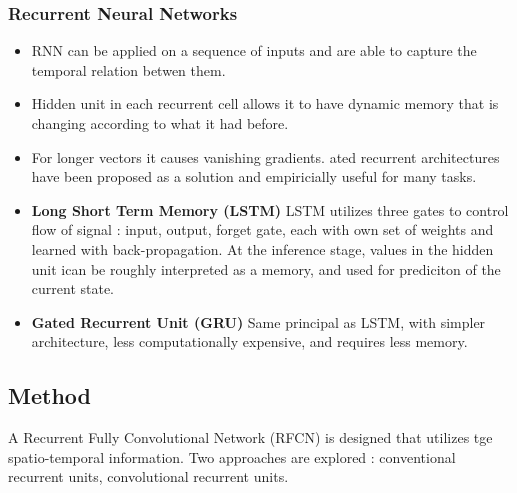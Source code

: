 \documentclass{article}
\begin{document}
\subsubsection{Recurrent Neural Networks}
\begin{itemize}
\item RNN can be applied on a sequence of inputs and are able to capture the temporal relation betwen them.
\item Hidden unit in each recurrent cell allows it to have dynamic memory that is changing according to what it had before.
\item For longer vectors it causes vanishing gradients. ated recurrent architectures have been proposed as a solution and empiricially useful for many tasks.
\item \textbf{Long Short Term Memory (LSTM)}
    LSTM utilizes three gates to control flow of signal : input, output, forget gate, each with own set of weights and learned with back-propagation. At the inference stage, values in the hidden unit ican be roughly interpreted as a memory, and used for prediciton of the current state.
\item \textbf{Gated Recurrent Unit (GRU)}
    Same principal as LSTM, with simpler architecture, less computationally expensive, and requires less memory.
\end{itemize}

\subsection{Method}
A Recurrent Fully Convolutional Network (RFCN) is designed that utilizes tge spatio-temporal information. Two approaches are explored : conventional recurrent units, convolutional recurrent units.
\end{document}
